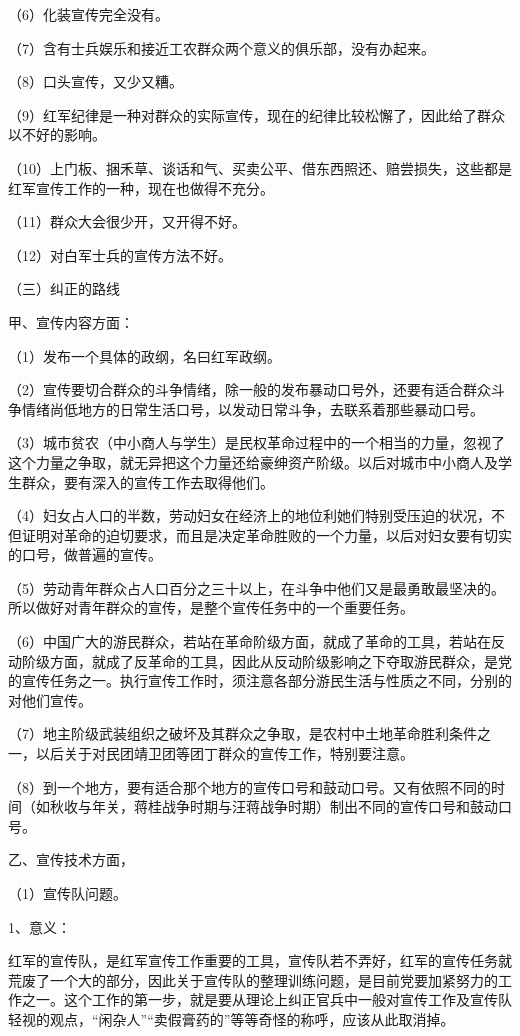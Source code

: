 （6）化装宣传完全没有。

（7）含有士兵娱乐和接近工农群众两个意义的俱乐部，没有办起来。

（8）口头宣传，又少又糟。

（9）红军纪律是一种对群众的实际宣传，现在的纪律比较松懈了，因此给了群众以不好的影响。

（10）上门板、捆禾草、谈话和气、买卖公平、借东西照还、赔尝损失，这些都是红军宣传工作的一种，现在也做得不充分。

（11）群众大会很少开，又开得不好。

（12）对白军士兵的宣传方法不好。

（三）纠正的路线

甲、宣传内容方面：

（1）发布一个具体的政纲，名曰红军政纲。

（2）宣传要切合群众的斗争情绪，除一般的发布暴动口号外，还要有适合群众斗争情绪尚低地方的日常生活口号，以发动日常斗争，去联系着那些暴动口号。

（3）城市贫农（中小商人与学生）是民权革命过程中的一个相当的力量，忽视了这个力量之争取，就无异把这个力量还给豪绅资产阶级。以后对城市中小商人及学生群众，要有深入的宣传工作去取得他们。

（4）妇女占人口的半数，劳动妇女在经济上的地位利她们特别受压迫的状况，不但证明对革命的迫切要求，而且是决定革命胜败的一个力量，以后对妇女要有切实的口号，做普遍的宣传。

（5）劳动青年群众占人口百分之三十以上，在斗争中他们又是最勇敢最坚决的。所以做好对青年群众的宣传，是整个宣传任务中的一个重要任务。

（6）中国广大的游民群众，若站在革命阶级方面，就成了革命的工具，若站在反动阶级方面，就成了反革命的工具，因此从反动阶级影响之下夺取游民群众，是党的宣传任务之一。执行宣传工作时，须注意各部分游民生活与性质之不同，分别的对他们宣传。

（7）地主阶级武装组织之破坏及其群众之争取，是农村中土地革命胜利条件之一，以后关于对民团靖卫团等团丁群众的宣传工作，特别要注意。

（8）到一个地方，要有适合那个地方的宣传口号和鼓动口号。又有依照不同的时间（如秋收与年关，蒋桂战争时期与汪蒋战争时期）制出不同的宣传口号和鼓动口号。

乙、宣传技术方面，

（1）宣传队问题。

1、意义：

红军的宣传队，是红军宣传工作重要的工具，宣传队若不弄好，红军的宣传任务就荒废了一个大的部分，因此关于宣传队的整理训练问题，是目前党要加紧努力的工作之一。这个工作的第一步，就是要从理论上纠正官兵中一般对宣传工作及宣传队轻视的观点，“闲杂人”“卖假膏药的”等等奇怪的称呼，应该从此取消掉。

